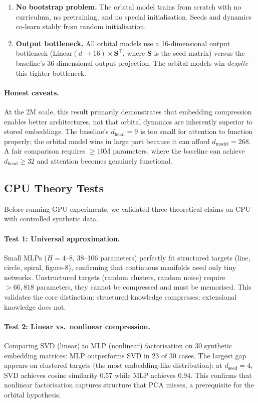 \documentclass[11pt, a4paper]{article}
\theoremstyle{remark}
\begin{document}
\begin{enumerate}[nosep]
    \item \textbf{No bootstrap problem.}
        The orbital model trains from scratch with no curriculum, no pretraining, and no special initialisation.
        Seeds and dynamics co-learn stably from random initialisation.

    \item \textbf{Output bottleneck.}
        All orbital models use a 16-dimensional output bottleneck ($\text{Linear}(d \to 16) \times \mathbf{S}^{\!\top}$, where $\mathbf{S}$ is the seed matrix) versus the baseline's 36-dimensional output projection.
        The orbital models win \emph{despite} this tighter bottleneck.
\end{enumerate}

\paragraph{Honest caveats.}
At the 2M scale, this result primarily demonstrates that embedding compression enables better architectures, not that orbital dynamics are inherently superior to stored embeddings.
The baseline's $d_{\text{head}} = 9$ is too small for attention to function properly; the orbital model wins in large part because it can afford $d_{\text{model}} = 268$.
A fair comparison requires ${\geq}10\text{M}$ parameters, where the baseline can achieve $d_{\text{head}} \geq 32$ and attention becomes genuinely functional.

\subsection{CPU Theory Tests}

Before running GPU experiments, we validated three theoretical claims on CPU with controlled synthetic data.

\paragraph{Test 1: Universal approximation.}
Small MLPs ($H = 4$--$8$, 38--106 parameters) perfectly fit structured targets (line, circle, spiral, figure-8), confirming that continuous manifolds need only tiny networks.
Unstructured targets (random clusters, random noise) require $> 66{,}818$ parameters, they cannot be compressed and must be memorised.
This validates the core distinction: structured knowledge compresses; extensional knowledge does not.

\paragraph{Test 2: Linear vs.\ nonlinear compression.}
Comparing SVD (linear) to MLP (nonlinear) factorisation on 30 synthetic embedding matrices:
MLP outperforms SVD in 23 of 30 cases.
The largest gap appears on clustered targets (the most embedding-like distribution): at $d_{\text{seed}} = 4$, SVD achieves cosine similarity 0.57 while MLP achieves 0.94.
This confirms that nonlinear factorisation captures structure that PCA misses, a prerequisite for the orbital hypothesis.
\end{document}
